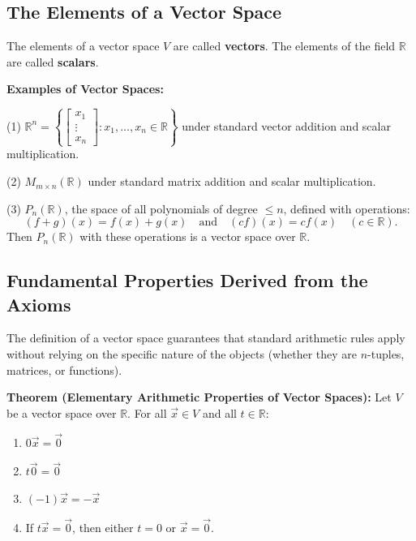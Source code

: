 \subsection{The Elements of a Vector Space}
The elements of a vector space $V$ are called \textbf{vectors}. The elements of the field $\mathbb{R}$ are called \textbf{scalars}.

\vspace{1em}
\noindent\textbf{Examples of Vector Spaces:}

(1) $\mathbb{R}^n = \left\{ \begin{bmatrix} x_1 \\ \vdots \\ x_n \end{bmatrix} : x_1, \dots, x_n \in \mathbb{R} \right\}$ under standard vector addition and scalar multiplication.

\vspace{1em}

(2) $M_{m \times n}(\mathbb{R})$ under standard matrix addition and scalar multiplication.

\vspace{1em}

(3) $P_n(\mathbb{R})$, the space of all polynomials of degree $\le n$, defined with operations:
\[
(f + g)(x) = f(x) + g(x) \quad \text{and} \quad (cf)(x) = c f(x) \quad (c \in \mathbb{R}).
\]
Then $P_n(\mathbb{R})$ with these operations is a vector space over $\mathbb{R}$.


\subsection{Fundamental Properties Derived from the Axioms}

The definition of a vector space guarantees that standard arithmetic rules apply without relying on the specific nature of the objects (whether they are $n$-tuples, matrices, or functions).

\vspace{1em}

\noindent \textbf{Theorem (Elementary Arithmetic Properties of Vector Spaces):} Let $V$ be a vector space over $\mathbb{R}$. For all $\vec{x} \in V$ and all $t \in \mathbb{R}$:
\begin{enumerate}[itemsep=0.8em, topsep=0.5em]
    \item $0\vec{x} = \vec{0}$
    \item $t\vec{0} = \vec{0}$
    \item $(-1)\vec{x} = -\vec{x}$
    \item If $t\vec{x} = \vec{0}$, then either $t = 0$ or $\vec{x} = \vec{0}$.
\end{enumerate}

